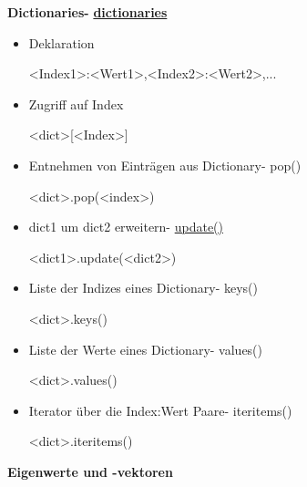 \documentclass[a4paper,9pt,DIV15,twocolumn]{scrartcl}
\begin{document}
\textbf{Dictionaries- } \href{http://docs.python.org/library/stdtypes.html?highlight=.update#mapping-types-dict}{\textbf{dictionaries}}
\begin{itemize}
 \item Deklaration
\begin{sagein}
{<Index1>:<Wert1>,<Index2>:<Wert2>,...}
\end{sagein}
 \item Zugriff auf Index
\begin{sagein}
 <dict>[<Index>]
\end{sagein}
\item Entnehmen von Eintr\"agen aus Dictionary- pop()
	\begin{sagein}
<dict>.pop(<index>)
	\end{sagein}
\item dict1 um dict2 erweitern- \href{http://docs.python.org/library/stdtypes.html?highlight=.update#dict.update}{update()}
\begin{sagein}
 <dict1>.update(<dict2>)
\end{sagein}

\item Liste der Indizes eines Dictionary- keys()
	\begin{sagein}
<dict>.keys()
	\end{sagein}

\item Liste der Werte eines Dictionary- values()
	\begin{sagein}
<dict>.values()
	\end{sagein}
\item Iterator \"uber die Index:Wert Paare- iteritems()
	\begin{sagein}
<dict>.iteritems()
	\end{sagein}
\end{itemize}
\textbf{Eigenwerte und -vektoren}
\end{document}

